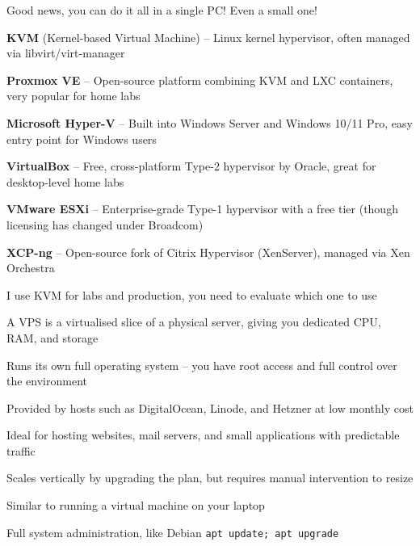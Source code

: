 \documentclass[Screen16to9,17pt]{foils}
\begin{document}
Good news, you can do it all in a single PC! Even a small one!





\begin{list2}
  \item {\bf KVM} (Kernel-based Virtual Machine) -- Linux kernel hypervisor, often managed via libvirt/virt-manager
  \item {\bf Proxmox VE} -- Open-source platform combining KVM and LXC containers, very popular for home labs
  \item {\bf Microsoft Hyper-V} -- Built into Windows Server and Windows 10/11 Pro, easy entry point for Windows users
  \item {\bf VirtualBox} -- Free, cross-platform Type-2 hypervisor by Oracle, great for desktop-level home labs
  \item {\bf VMware ESXi} -- Enterprise-grade Type-1 hypervisor with a free tier (though licensing has changed under Broadcom)
  \item {\bf XCP-ng} -- Open-source fork of Citrix Hypervisor (XenServer), managed via Xen Orchestra
\end{list2}

I use KVM for labs and production, you need to evaluate which one to use


\begin{list2}
\item A VPS is a virtualised slice of a physical server, giving you dedicated CPU, RAM, and storage
\item Runs its own full operating system -- you have root access and full control over the environment
\item Provided by hosts such as DigitalOcean, Linode, and Hetzner at low monthly cost
\item Ideal for hosting websites, mail servers, and small applications with predictable traffic
\item Scales vertically by upgrading the plan, but requires manual intervention to resize
\item Similar to running a virtual machine on your laptop
\item Full system administration, like Debian \verb+apt update; apt upgrade+
\end{list2}
\end{document}
